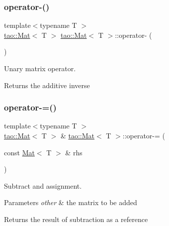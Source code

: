 \subsubsection{\texorpdfstring{operator-\/()}{operator-()}\hspace{0.1cm}{\footnotesize\ttfamily [2/2]}}
{\footnotesize\ttfamily template$<$typename T $>$ \\
\mbox{\hyperlink{classtao_1_1_mat}{tao\+::\+Mat}}$<$ T $>$ \mbox{\hyperlink{classtao_1_1_mat}{tao\+::\+Mat}}$<$ T $>$\+::operator-\/ (\begin{DoxyParamCaption}{ }\end{DoxyParamCaption})}



Unary matrix operator. 

\begin{DoxyReturn}{Returns}
the additive inverse 
\end{DoxyReturn}
\mbox{\label{classtao_1_1_mat_ac7109400de3729992a23e6d8ea5857b6}} 
\subsubsection{\texorpdfstring{operator-\/=()}{operator-=()}}
{\footnotesize\ttfamily template$<$typename T $>$ \\
\mbox{\hyperlink{classtao_1_1_mat}{tao\+::\+Mat}}$<$ T $>$ \& \mbox{\hyperlink{classtao_1_1_mat}{tao\+::\+Mat}}$<$ T $>$\+::operator-\/= (\begin{DoxyParamCaption}\item[{const \mbox{\hyperlink{classtao_1_1_mat}{Mat}}$<$ T $>$ \&}]{rhs }\end{DoxyParamCaption})}



Subtract and assignment. 


\begin{DoxyParams}{Parameters}
{\em other} & the matrix to be added \\
\hline
\end{DoxyParams}
\begin{DoxyReturn}{Returns}
the result of subtraction as a reference 
\end{DoxyReturn}
\mbox{\label{classtao_1_1_mat_a0f550cb7daaaf75abe46f3cda97f7df9}} 
